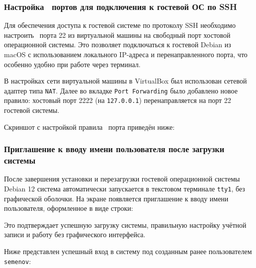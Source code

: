 
\subsubsection{Настройка \frqq\ портов для подключения к гостевой ОС по SSH}

Для обеспечения доступа к гостевой системе по протоколу SSH необходимо настроить \frqq\ порта 22 из виртуальной машины на свободный порт хостовой операционной системы. Это позволяет подключаться к гостевой Debian из macOS с использованием локального IP-адреса и перенаправленного порта, что особенно удобно при работе через терминал.

В настройках сети виртуальной машины в VirtualBox был использован сетевой адаптер типа \texttt{NAT}. Далее во вкладке \texttt{Port Forwarding} было добавлено новое правило: хостовый порт 2222 (на \texttt{127.0.0.1}) перенаправляется на порт 22 гостевой системы.

Скриншот с настройкой правила \frqq\ порта приведён ниже:


\subsubsection*{Приглашение к вводу имени пользователя после загрузки системы}

После завершения установки и перезагрузки гостевой операционной системы Debian 12 система автоматически запускается в текстовом терминале \texttt{tty1}, без графической оболочки. На экране появляется приглашение к вводу имени пользователя, оформленное в виде строки:


Это подтверждает успешную загрузку системы, правильную настройку учётной записи и работу без графического интерфейса.

Ниже представлен успешный вход в систему под созданным ранее пользователем \texttt{semenov}:

